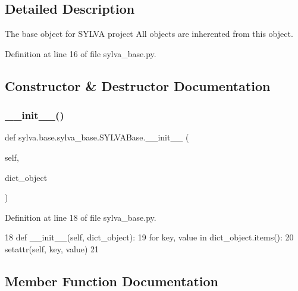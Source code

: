 \subsection{Detailed Description}
The base object for S\+Y\+L\+VA project All objects are inherented from this object. 

Definition at line 16 of file sylva\+\_\+base.\+py.



\subsection{Constructor \& Destructor Documentation}
\mbox{\label{classsylva_1_1base_1_1sylva__base_1_1_s_y_l_v_a_base_a5692ae87ad4953fdfe317953fcf530f8}} 
\subsubsection{\texorpdfstring{\+\_\+\+\_\+init\+\_\+\+\_\+()}{\_\_init\_\_()}}
{\footnotesize\ttfamily def sylva.\+base.\+sylva\+\_\+base.\+S\+Y\+L\+V\+A\+Base.\+\_\+\+\_\+init\+\_\+\+\_\+ (\begin{DoxyParamCaption}\item[{}]{self,  }\item[{}]{dict\+\_\+object }\end{DoxyParamCaption})}



Definition at line 18 of file sylva\+\_\+base.\+py.


\begin{DoxyCode}
18     \textcolor{keyword}{def }\_\_init\_\_(self, dict\_object):
19         \textcolor{keywordflow}{for} key, value \textcolor{keywordflow}{in} dict\_object.items():
20             setattr(self, key, value)
21 
\end{DoxyCode}


\subsection{Member Function Documentation}
\mbox{\label{classsylva_1_1base_1_1sylva__base_1_1_s_y_l_v_a_base_a8dc04df3b843a1deb6e1ae13f8425783}} 
